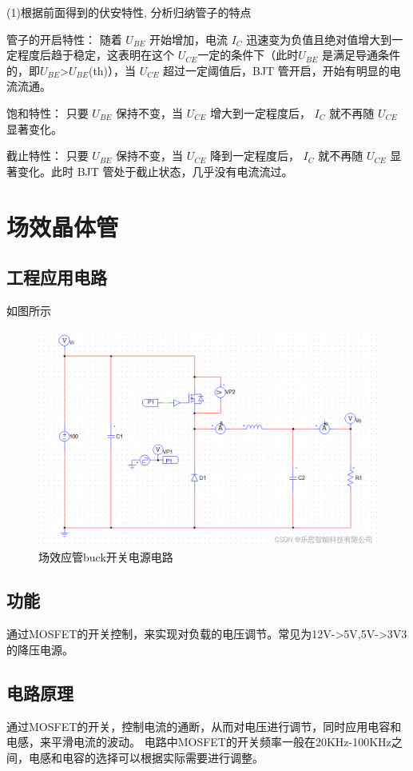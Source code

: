 \documentclass[10pt, a4paper]{article} %
\begin{document}
(1)根据前面得到的伏安特性, 分析归纳管子的特点

管子的开启特性：
随着 $U_{BE}$ 开始增加，电流 $I_{C}$ 迅速变为负值且绝对值增大到一定程度后趋于稳定，这表明在这个 $U_{CE}$一定的条件下（此时$U_{BE}$ 是满足导通条件的，即$U_{BE}$>$U_{BE}$(th)），当 $U_{CE}$ 超过一定阈值后，BJT 管开启，开始有明显的电流流通。

饱和特性：
只要 $U_{BE}$ 保持不变，当 $U_{CE}$ 增大到一定程度后， $I_{C}$ 就不再随 $U_{CE}$ 显著变化。

截止特性：
只要 $U_{BE}$ 保持不变，当 $U_{CE}$ 降到一定程度后， $I_{C}$ 就不再随 $U_{CE}$ 显著变化。此时 BJT 管处于截止状态，几乎没有电流流过。

\section{场效晶体管}
\subsection{工程应用电路}
如图所示
\begin{figure}[ht]
    \centering
    \includegraphics[width=0.8\linewidth]{image/9.png}
    \caption{场效应管buck开关电源电路}
    \label{fig:mosfet_circuit}
\end{figure}
\subsection{功能}
通过MOSFET的开关控制，来实现对负载的电压调节。常见为12V->5V,5V->3V3的降压电源。

\subsection{电路原理}
通过MOSFET的开关，控制电流的通断，从而对电压进行调节，同时应用电容和电感，来平滑电流的波动。
电路中MOSFET的开关频率一般在20KHz-100KHz之间，电感和电容的选择可以根据实际需要进行调整。
\end{document}
